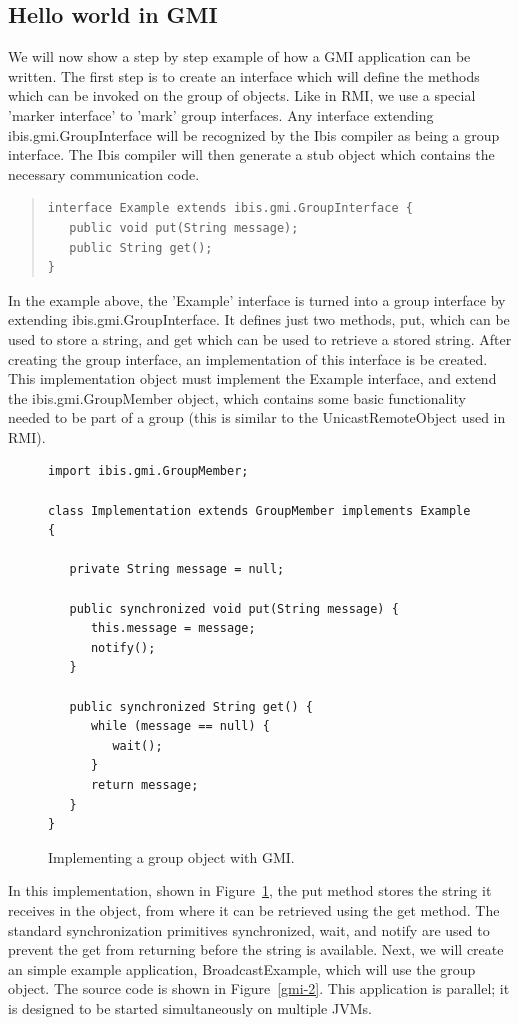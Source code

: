 \documentclass[10pt]{article}
\newcommand{\mysubsection}[1]{\subsection{#1}\label{#1}}
\begin{document}
\mysubsection{Hello world in GMI}

We will now show a
step by step example of how a GMI application can be written. The
first step is to create an interface which will define the methods
which can be invoked on the group of objects. Like in RMI, we use a
special 'marker interface' to 'mark' group interfaces. Any interface
extending ibis.gmi.GroupInterface will be recognized by the Ibis
compiler as being a group interface. The Ibis compiler will then
generate a stub object which contains the necessary communication
code.

{\small
\begin{quote}
\begin{verbatim}
interface Example extends ibis.gmi.GroupInterface {
   public void put(String message);
   public String get();
}
\end{verbatim}
\end{quote}
}
\noindent

In the example above, the 'Example' interface is turned into a group
interface by extending ibis.gmi.GroupInterface. It defines just two
methods, put, which can be used to store a string, and get which can
be used to retrieve a stored string.  After creating the group
interface, an implementation of this interface is be created. This
implementation object must implement the Example interface, and extend
the ibis.gmi.GroupMember object, which contains some basic
functionality needed to be part of a group (this is similar to the
UnicastRemoteObject used in RMI).

\begin{figure}[t!]
{\small
\begin{verbatim}
import ibis.gmi.GroupMember;

class Implementation extends GroupMember implements Example {

   private String message = null;

   public synchronized void put(String message) {
      this.message = message;
      notify();
   }
   
   public synchronized String get() { 
      while (message == null) { 
         wait();
      }       
      return message;
   } 
}
\end{verbatim}
}
\caption{Implementing a group object with GMI.}
\label{gmi-1}
\end{figure}

In this implementation, shown in Figure~\ref{gmi-1}, the put method stores the
string it receives in the object, from where it can be retrieved using
the get method. The standard synchronization primitives synchronized,
wait, and notify are used to prevent the get from returning before the
string is available.  Next, we will create an simple example
application, BroadcastExample, which will use the group object. The
source code is shown in Figure~\ref{gmi-2}. This application is parallel; it is
designed to be started simultaneously on multiple JVMs.
\end{document}
